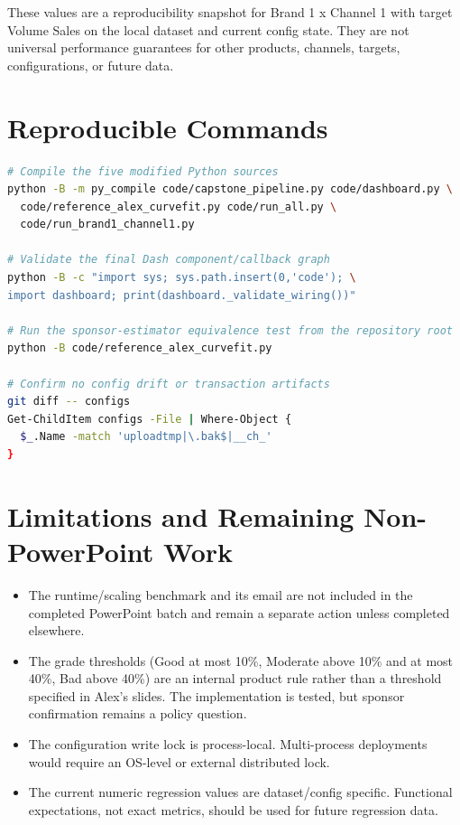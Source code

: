 \documentclass[11pt]{article}
\begin{document}
These values are a reproducibility snapshot for Brand 1 x Channel 1 with target Volume Sales on the local dataset and current config state. They are not universal performance guarantees for other products, channels, targets, configurations, or future data.

\section{Reproducible Commands}

\begin{lstlisting}[language=bash]
# Compile the five modified Python sources
python -B -m py_compile code/capstone_pipeline.py code/dashboard.py \
  code/reference_alex_curvefit.py code/run_all.py \
  code/run_brand1_channel1.py

# Validate the final Dash component/callback graph
python -B -c "import sys; sys.path.insert(0,'code'); \
import dashboard; print(dashboard._validate_wiring())"

# Run the sponsor-estimator equivalence test from the repository root
python -B code/reference_alex_curvefit.py

# Confirm no config drift or transaction artifacts
git diff -- configs
Get-ChildItem configs -File | Where-Object {
  $_.Name -match 'uploadtmp|\.bak$|__ch_'
}
\end{lstlisting}

\section{Limitations and Remaining Non-PowerPoint Work}

\begin{itemize}
  \item The runtime/scaling benchmark and its email are not included in the completed PowerPoint batch and remain a separate action unless completed elsewhere.
  \item The grade thresholds (Good at most 10\%, Moderate above 10\% and at most 40\%, Bad above 40\%) are an internal product rule rather than a threshold specified in Alex's slides. The implementation is tested, but sponsor confirmation remains a policy question.
  \item The configuration write lock is process-local. Multi-process deployments would require an OS-level or external distributed lock.
  \item The current numeric regression values are dataset/config specific. Functional expectations, not exact metrics, should be used for future regression data.
\end{itemize}
\end{document}
